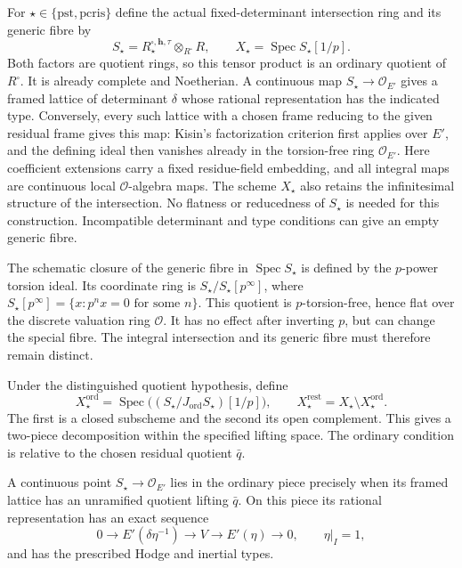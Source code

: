 For $\star\in\{\mathrm{pst},\mathrm{pcris}\}$ define the actual
fixed-determinant intersection ring and its generic fibre by
\[
 S_\star=R^{\square,\mathbf h,\tau}_\star
             \otimes_{R^\square}R,
 \qquad X_\star=\operatorname{Spec}S_\star[1/p].
\]
Both factors are quotient rings, so this tensor product is an
ordinary quotient of $R^\square$. It is already complete and
Noetherian. A continuous map $S_\star\to\mathcal O_{E'}$
gives a framed lattice of determinant $\delta$ whose rational
representation has the indicated type. Conversely, every such
lattice with a chosen frame reducing to the given residual frame
gives this map: Kisin's factorization criterion first applies over
$E'$, and the defining ideal then vanishes already in the
torsion-free ring $\mathcal O_{E'}$. Here coefficient extensions
carry a fixed residue-field embedding, and all integral maps are
continuous local $\mathcal O$-algebra maps.
The scheme $X_\star$ also retains the infinitesimal structure of
the intersection. No flatness or reducedness of $S_\star$ is needed
for this construction. Incompatible determinant and type conditions
can give an empty generic fibre.

The schematic closure of the generic fibre in $\operatorname{Spec}S_\star$
is defined by the $p$-power torsion ideal. Its coordinate ring is
$S_\star/S_\star[p^\infty]$, where
$S_\star[p^\infty]=\{x:p^n x=0\text{ for some }n\}$.
This quotient is $p$-torsion-free, hence flat over the discrete
valuation ring $\mathcal O$. It has no effect after inverting $p$,
but can change the special fibre. The integral intersection and its generic fibre
must therefore remain distinct.

Under the distinguished quotient hypothesis, define
\[
 X_\star^{\mathrm{ord}}
 =\operatorname{Spec}\bigl((S_\star/J_{\mathrm{ord}}S_\star)[1/p]\bigr),
 \qquad
 X_\star^{\mathrm{rest}}=X_\star\setminus X_\star^{\mathrm{ord}}.
\]
The first is a closed subscheme and the second its open complement.
This gives a two-piece decomposition within the specified lifting
space. The ordinary condition is relative to the chosen residual
quotient $\bar q$.

\begin{corollary}
\label{v4-arith:ordinary-local:typed-ordinary}
A continuous point $S_\star\to\mathcal O_{E'}$ lies in the ordinary
piece precisely when its framed lattice has an unramified quotient
lifting $\bar q$. On this piece its rational representation has
an exact sequence
\[
 0\longrightarrow E'(\delta\eta^{-1})\longrightarrow V
 \longrightarrow E'(\eta)\longrightarrow0,
 \qquad \eta|_I=1,
\]
and has the prescribed Hodge and inertial types.
\end{corollary}

